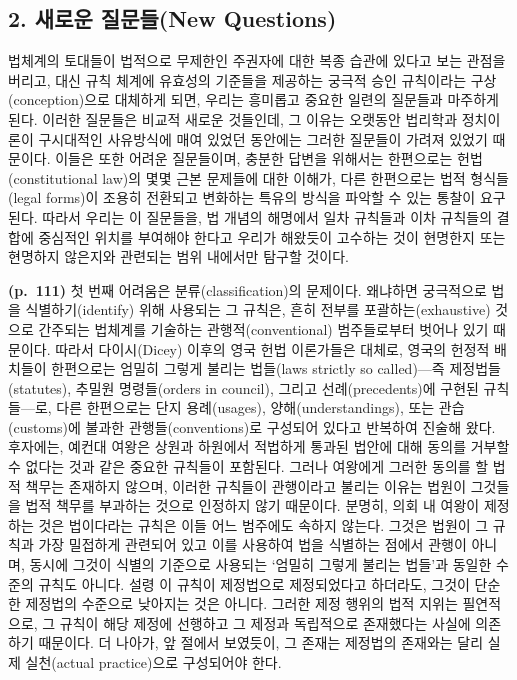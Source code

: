 \subsection{2. 새로운 질문들(New
Questions)}\label{uxc0c8uxb85cuxc6b4-uxc9c8uxbb38uxb4e4new-questions}

법체계의 토대들이 법적으로 무제한인 주권자에 대한 복종 습관에 있다고
보는 관점을 버리고, 대신 규칙 체계에 유효성의 기준들을 제공하는 궁극적
승인 규칙이라는 구상(conception)으로 대체하게 되면, 우리는 흥미롭고
중요한 일련의 질문들과 마주하게 된다. 이러한 질문들은 비교적 새로운
것들인데, 그 이유는 오랫동안 법리학과 정치이론이 구시대적인 사유방식에
매여 있었던 동안에는 그러한 질문들이 가려져 있었기 때문이다. 이들은 또한
어려운 질문들이며, 충분한 답변을 위해서는 한편으로는 헌법(constitutional
law)의 몇몇 근본 문제들에 대한 이해가, 다른 한편으로는 법적 형식들(legal
forms)이 조용히 전환되고 변화하는 특유의 방식을 파악할 수 있는 통찰이
요구된다. 따라서 우리는 이 질문들을, 법 개념의 해명에서 일차 규칙들과
이차 규칙들의 결합에 중심적인 위치를 부여해야 한다고 우리가 해왔듯이
고수하는 것이 현명한지 또는 현명하지 않은지와 관련되는 범위 내에서만
탐구할 것이다.

\textbf{(p.~111)} 첫 번째 어려움은 분류(classification)의 문제이다.
왜냐하면 궁극적으로 법을 식별하기(identify) 위해 사용되는 그 규칙은,
흔히 전부를 포괄하는(exhaustive) 것으로 간주되는 법체계를 기술하는
관행적(conventional) 범주들로부터 벗어나 있기 때문이다. 따라서
다이시(Dicey) 이후의 영국 헌법 이론가들은 대체로, 영국의 헌정적 배치들이
한편으로는 엄밀히 그렇게 불리는 법들(laws strictly so called)---즉
제정법들(statutes), 추밀원 명령들(orders in council), 그리고
선례(precedents)에 구현된 규칙들---로, 다른 한편으로는 단지
용례(usages), 양해(understandings), 또는 관습(customs)에 불과한
관행들(conventions)로 구성되어 있다고 반복하여 진술해 왔다. 후자에는,
예컨대 여왕은 상원과 하원에서 적법하게 통과된 법안에 대해 동의를 거부할
수 없다는 것과 같은 중요한 규칙들이 포함된다. 그러나 여왕에게 그러한
동의를 할 법적 책무는 존재하지 않으며, 이러한 규칙들이 관행이라고 불리는
이유는 법원이 그것들을 법적 책무를 부과하는 것으로 인정하지 않기
때문이다. 분명히, 의회 내 여왕이 제정하는 것은 법이다라는 규칙은 이들
어느 범주에도 속하지 않는다. 그것은 법원이 그 규칙과 가장 밀접하게
관련되어 있고 이를 사용하여 법을 식별하는 점에서 관행이 아니며, 동시에
그것이 식별의 기준으로 사용되는 ‘엄밀히 그렇게 불리는 법들’과 동일한
수준의 규칙도 아니다. 설령 이 규칙이 제정법으로 제정되었다고 하더라도,
그것이 단순한 제정법의 수준으로 낮아지는 것은 아니다. 그러한 제정 행위의
법적 지위는 필연적으로, 그 규칙이 해당 제정에 선행하고 그 제정과
독립적으로 존재했다는 사실에 의존하기 때문이다. 더 나아가, 앞 절에서
보였듯이, 그 존재는 제정법의 존재와는 달리 실제 실천(actual
practice)으로 구성되어야 한다.


